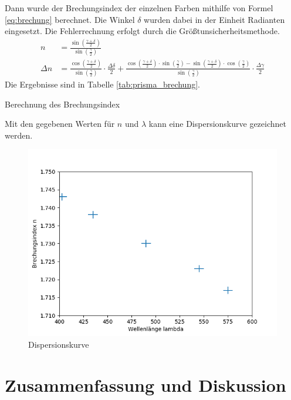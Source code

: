 \documentclass{article}
\begin{document}
Dann wurde der Brechungsindex der einzelnen Farben mithilfe von Formel \eqref{eq:brechung} berechnet. Die Winkel $\delta$ wurden dabei in der Einheit Radianten eingesetzt. Die Fehlerrechnung erfolgt durch die Größtunsicherheitsmethode.
\begin{align*}
n &= \frac{\sin\left(\frac{\gamma + \delta}{2}\right)}{\sin\left(\frac{\gamma}{2}\right)} \\
\Delta n &= \frac{\cos\left(\frac{\gamma + \delta}{2}\right)}{\sin\left(\frac{\gamma}{2}\right)}\cdot \frac{\Delta \delta}{2} + \frac{\cos\left(\frac{\gamma + \delta}{2}\right)\cdot \sin\left(\frac{\gamma}{2}\right) - \sin\left(\frac{\gamma + \delta}{2}\right)\cdot \cos\left(\frac{\gamma}{2}\right)}{\sin\left(\frac{\gamma}{2}\right)} \cdot\frac{\Delta \gamma}{2}
\end{align*}
Die Ergebnisse sind in Tabelle \ref{tab:prisma_brechung}.


\begin{table}[H]
\caption{Berechnung des Brechungsindex}
\label{tab:prisma_brechung}
\centering

\end{table}


Mit den gegebenen Werten für $n$ und $\lambda$ kann eine Dispersionskurve gezeichnet werden.
\begin{figure}[H]
\label{fig:dispersion}
\includegraphics[scale=0.7]{kurve.png}
\caption{Dispersionskurve}
\end{figure}

\section{Zusammenfassung und Diskussion}
\end{document}
